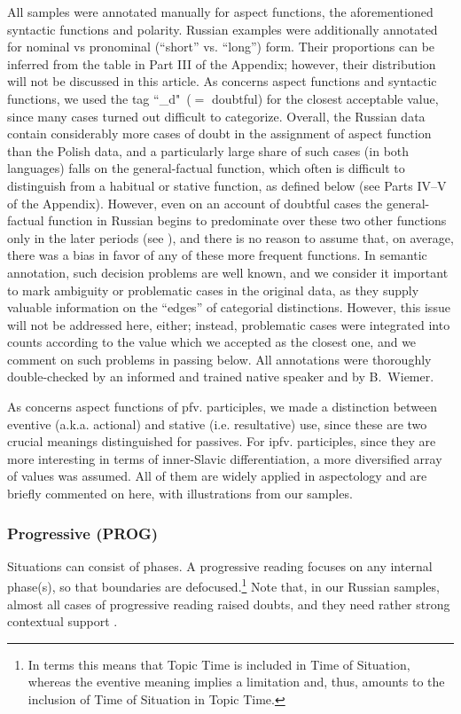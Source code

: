 \documentclass[output=paper]{langscibook}
\begin{document}
All samples were annotated manually for aspect functions, the aforementioned syntactic functions and polarity. Russian examples were additionally annotated for nominal vs pronominal (``short'' vs. ``long'') form. Their proportions can be inferred from the table in Part III of the Appendix; however, their distribution will not be discussed in this article. As concerns aspect functions and syntactic functions, we used the tag ``\_d"~($=$ doubtful) for the closest acceptable value, since many cases turned out difficult to categorize. Overall, the Russian data contain considerably more cases of doubt in the assignment of aspect function than the Polish data, and a particularly large share of such cases (in both languages) falls on the general-factual function, which often is difficult to distinguish from a habitual or stative function, as defined below (see Parts IV--V of the Appendix). However, even on an account of doubtful cases the general-factual function in Russian begins to predominate over these two other functions only in the later periods (see ), and there is no reason to assume that, on average, there was a bias in favor of any of these more frequent functions. In semantic annotation, such decision problems are well known, and we consider it important to mark ambiguity or problematic cases in the original data, as they supply valuable information on the “edges” of categorial distinctions. However, this issue will not be addressed here, either; instead, problematic cases were integrated into counts according to the value which we accepted as the closest one, and we comment on such problems in passing below. All annotations were thoroughly double-checked by an informed and trained native speaker and by B.~Wiemer.

As concerns aspect functions of pfv. participles, we made a distinction between eventive (a.k.a. actional) and stative (i.e. resultative) use, since these are two crucial meanings distinguished for passives. For ipfv. participles, since they are more interesting in terms of inner-Slavic differentiation, a more diversified array of values was assumed. All of them are widely applied in aspectology and are briefly commented on here, with illustrations from our samples.

\subsubsection{Progressive (PROG)}

Situations can consist of phases. A progressive reading focuses on any internal phase(s), so that boundaries are defocused.\footnote{In  terms this means that Topic Time is included in Time of Situation, whereas the eventive meaning implies a limitation and, thus, amounts to the inclusion of Time of Situation in Topic Time.} Note that, in our Russian samples, almost all cases of progressive reading raised doubts, and they need rather strong contextual support .
\end{document}
